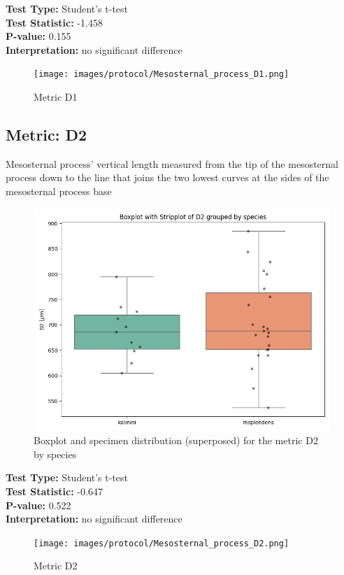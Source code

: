 \noindent\textbf{Test Type:} Student's t-test \\
\noindent\textbf{Test Statistic:} -1.458 \\
\noindent\textbf{P-value:} 0.155 \\
\noindent\textbf{Interpretation:} no significant difference

\begin{figure}[H]
\centering
\texttt{[image: images/protocol/Mesosternal\_process\_D1.png]}
\caption{ Metric D1}
\end{figure}

\newpage
\subsection*{Metric: D2}

Mesosternal process’ vertical length measured from the tip of the mesosternal process down to the line that joins the two lowest curves at the sides of the mesosternal process base

\begin{figure}[H]
\centering
\includegraphics[width=0.7\linewidth]{images/boxplot/boxplot_D2.png}
\caption{  Boxplot and specimen distribution (superposed) for the metric  D2 by species}
\end{figure}

\noindent\textbf{Test Type:} Student's t-test \\
\noindent\textbf{Test Statistic:} -0.647 \\
\noindent\textbf{P-value:} 0.522 \\
\noindent\textbf{Interpretation:} no significant difference

\begin{figure}[H]
\centering
\texttt{[image: images/protocol/Mesosternal\_process\_D2.png]}
\caption{ Metric D2}
\end{figure}

